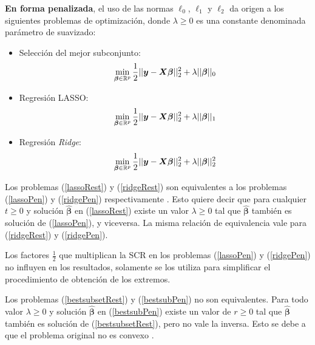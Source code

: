 \documentclass[a4paper,12pt]{report}
\begin{document}
\textbf{En forma penalizada}, el uso de las normas $\ell_0$, $\ell_1$ y $\ell_2$ da origen a los siguientes problemas de optimización, donde $\lambda \geq 0$ es una constante denominada parámetro de suavizado:
\begin{itemize}
\item Selección del mejor subconjunto:
\begin{equation}
\label{bestsubPen}
\operatornamewithlimits{min}\limits_{\boldsymbol{\beta} \in \mathbb{R}^p} \frac{1}{2} ||\boldsymbol{y}-\boldsymbol{X}\boldsymbol{\beta} ||_2^2+\lambda ||\boldsymbol{\beta}||_0
\end{equation}
\item Regresión LASSO:
\begin{equation}
\label{lassoPen}
\operatornamewithlimits{min}\limits_{\boldsymbol{\beta} \in \mathbb{R}^p} \frac{1}{2} ||\boldsymbol{y}-\boldsymbol{X}\boldsymbol{\beta} ||_2^2+\lambda ||\boldsymbol{\beta}||_1
\end{equation}
\item Regresión \textit{Ridge}:
\begin{equation}
\label{ridgePen}
\operatornamewithlimits{min}\limits_{\boldsymbol{\beta} \in \mathbb{R}^p} \frac{1}{2} ||\boldsymbol{y}-\boldsymbol{X}\boldsymbol{\beta} ||_2^2+\lambda ||\boldsymbol{\beta}||_2^2
\end{equation}
\end{itemize}

Los problemas (\ref{lassoRest}) y (\ref{ridgeRest}) son equivalentes a los problemas (\ref{lassoPen}) y (\ref{ridgePen}) respectivamente \citep{kloft2009efficient}. Esto quiere decir que para cualquier $t \geq 0$ y solución $\boldsymbol{\hat{\beta}}$ en (\ref{lassoRest}) existe un valor $\lambda \geq 0$ tal que $\boldsymbol{\hat{\beta}}$ también es solución de (\ref{lassoPen}), y viceversa. La misma relación de equivalencia vale para (\ref{ridgeRest}) y (\ref{ridgePen}).

Los factores $\frac{1}{2}$ que multiplican la SCR en los problemas (\ref{lassoPen}) y (\ref{ridgePen}) no influyen en los resultados, solamente se los utiliza para simplificar el procedimiento de obtención de los extremos. 

Los problemas (\ref{bestsubsetRest}) y (\ref{bestsubPen}) no son equivalentes. Para todo valor $\lambda \geq 0$ y solución $\boldsymbol{\hat{\beta}}$ en (\ref{bestsubPen}) existe un valor de $r \geq 0$ tal que $\boldsymbol{\hat{\beta}}$ también es solución de (\ref{bestsubsetRest}), pero no vale la inversa. Esto se debe a que el problema original no es convexo \citep{hastie2015statistical}.
\end{document}

